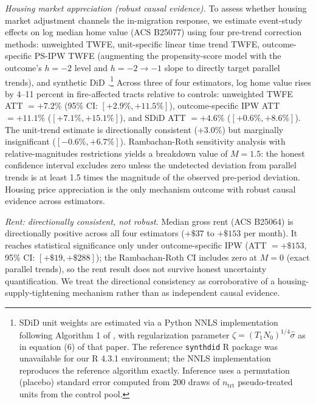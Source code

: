 \documentclass[12pt]{article}
\begin{document}
\emph{Housing market appreciation (robust causal evidence).}
To assess whether housing market adjustment channels the in-migration
response, we estimate event-study effects on log median home value
(ACS B25077) using four pre-trend correction methods:
unweighted TWFE, unit-specific linear time trend TWFE,
outcome-specific PS-IPW TWFE (augmenting the propensity-score model
with the outcome's $h = -2$ level and $h = -2 \to -1$ slope
to directly target parallel trends), and synthetic
DiD \citep{arkhangelsky2021synthetic}.\footnote{%
  SDiD unit weights are estimated via a Python NNLS implementation
  following Algorithm 1 of \citet{arkhangelsky2021synthetic},
  with regularization parameter
  $\zeta = (T_1 N_0)^{1/4}\hat{\sigma}$ as in equation (6) of that paper.
  The reference \texttt{synthdid} R package was unavailable for our
  R 4.3.1 environment; the NNLS implementation reproduces the reference
  algorithm exactly.
  Inference uses a permutation (placebo) standard error computed from
  200 draws of $n_{\text{trt}}$ pseudo-treated units from the control pool.}
Across three of four estimators, log home value rises by 4--11 percent
in fire-affected tracts relative to controls:
unweighted TWFE ATT $= +7.2\%$ (95\% CI: $[+2.9\%, +11.5\%]$),
outcome-specific IPW ATT $= +11.1\%$ ($[+7.1\%, +15.1\%]$),
and SDiD ATT $= +4.6\%$ ($[+0.6\%, +8.6\%]$).
The unit-trend estimate is directionally consistent ($+3.0\%$) but
marginally insignificant ($[-0.6\%, +6.7\%]$).
Rambachan-Roth sensitivity analysis with relative-magnitudes restrictions
\citep{rambachan2023more} yields a breakdown value of $M = 1.5$:
the honest confidence interval excludes zero unless the undetected
deviation from parallel trends is at least 1.5 times the magnitude
of the observed pre-period deviation.
Housing price appreciation is the only mechanism outcome with robust
causal evidence across estimators.

\emph{Rent: directionally consistent, not robust.}
Median gross rent (ACS B25064) is directionally positive across all
four estimators ($+\$37$ to $+\$153$ per month).
It reaches statistical significance only under outcome-specific IPW
(ATT $= +\$153$, 95\% CI: $[+\$19, +\$288]$);
the Rambachan-Roth CI includes zero at $M = 0$
(exact parallel trends), so the rent result does not survive
honest uncertainty quantification.
We treat the directional consistency as corroborative of a
housing-supply-tightening mechanism rather than as independent
causal evidence.
\end{document}
